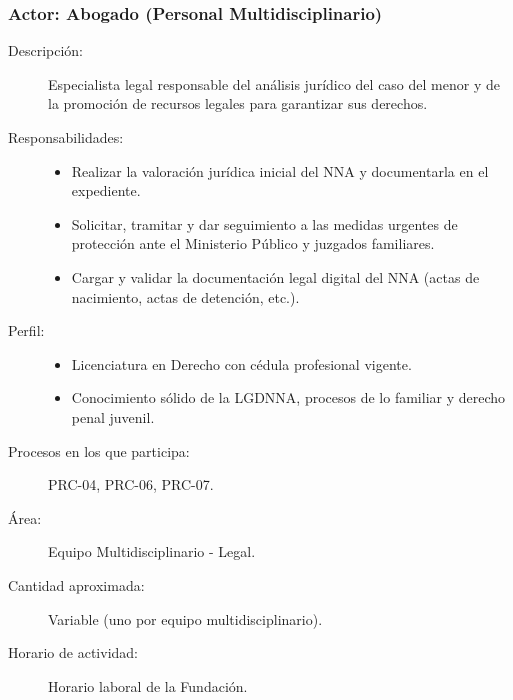 \subsubsection{Actor: Abogado (Personal Multidisciplinario)}
\begin{description}
	\item[Descripción:] Especialista legal responsable del análisis jurídico del caso del menor y de la promoción de recursos legales para garantizar sus derechos.
	\item[Responsabilidades:] \cdtEmpty
	\begin{itemize}
		\item Realizar la valoración jurídica inicial del NNA y documentarla en el expediente.
		\item Solicitar, tramitar y dar seguimiento a las medidas urgentes de protección ante el Ministerio Público y juzgados familiares.
		\item Cargar y validar la documentación legal digital del NNA (actas de nacimiento, actas de detención, etc.).
	\end{itemize}
	\item[Perfil:] \cdtEmpty
	\begin{itemize}
		\item Licenciatura en Derecho con cédula profesional vigente.
		\item Conocimiento sólido de la LGDNNA, procesos de lo familiar y derecho penal juvenil.
	\end{itemize}
	\item[Procesos en los que participa:] PRC-04, PRC-06, PRC-07.
	\item[Área:] Equipo Multidisciplinario - Legal.
	\item[Cantidad aproximada:] Variable (uno por equipo multidisciplinario).
	\item[Horario de actividad:] Horario laboral de la Fundación.
\end{description}

